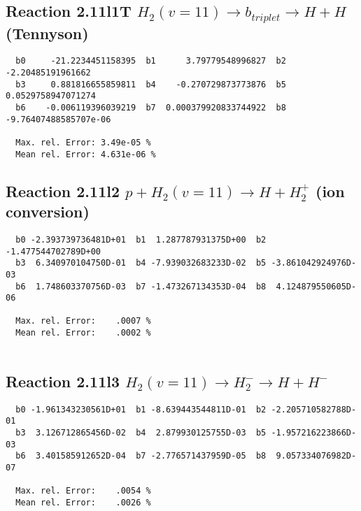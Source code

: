 \documentclass[12pt]{article}
\begin{document}
\subsection{
Reaction 2.11l1T
$  H_2(v=11) \rightarrow b_{triplet}\rightarrow H + H $ (Tennyson)
}


\begin{small}\begin{verbatim}
  b0     -21.2234451158395  b1      3.79779548996827  b2     -2.20485191961662
  b3     0.881816655859811  b4    -0.270729873773876  b5    0.0529758947071274
  b6    -0.006119396039219  b7  0.000379920833744922  b8 -9.76407488585707e-06

  Max. rel. Error: 3.49e-05 %
  Mean rel. Error: 4.631e-06 %

\end{verbatim}\end{small}

\subsection{
Reaction 2.11l2
$ p + H_2(v=11) \rightarrow H + H_2^+$ (ion conversion)
}


\begin{small}\begin{verbatim}
  b0 -2.393739736481D+01  b1  1.287787931375D+00  b2 -1.477544702789D+00
  b3  6.340970104750D-01  b4 -7.939032683233D-02  b5 -3.861042924976D-03
  b6  1.748603370756D-03  b7 -1.473267134353D-04  b8  4.124879550605D-06

  Max. rel. Error:    .0007 %
  Mean rel. Error:    .0002 %


\end{verbatim}\end{small}


\subsection{
Reaction 2.11l3
 $ H_2(v=11) \rightarrow H_2^- \rightarrow H + H^-$
}


\begin{small}\begin{verbatim}
  b0 -1.961343230561D+01  b1 -8.639443544811D-01  b2 -2.205710582788D-01
  b3  3.126712865456D-02  b4  2.879930125755D-03  b5 -1.957216223866D-03
  b6  3.401585912652D-04  b7 -2.776571437959D-05  b8  9.057334076982D-07

  Max. rel. Error:    .0054 %
  Mean rel. Error:    .0026 %


\end{verbatim}\end{small}
\end{document}
